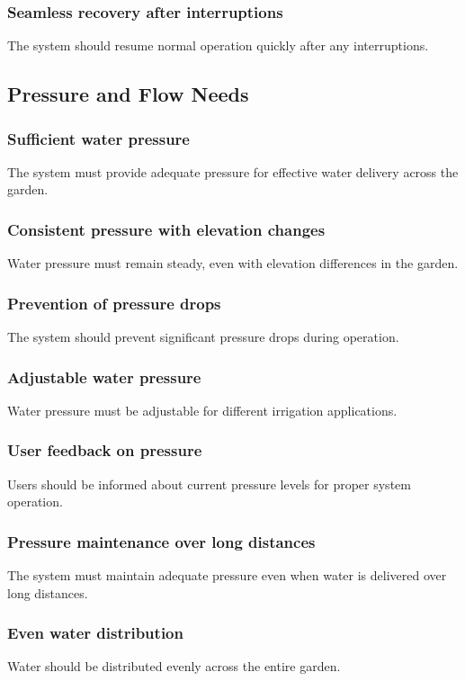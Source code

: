 \documentclass[11pt]{article}
\begin{document}
\subsubsection{Seamless recovery after interruptions}
The system should resume normal operation quickly after any interruptions.

\newpage
\subsection{Pressure and Flow Needs}

\subsubsection{Sufficient water pressure}
The system must provide adequate pressure for effective water delivery across the garden.

\subsubsection{Consistent pressure with elevation changes}
Water pressure must remain steady, even with elevation differences in the garden.

\subsubsection{Prevention of pressure drops}
The system should prevent significant pressure drops during operation.

\subsubsection{Adjustable water pressure}
Water pressure must be adjustable for different irrigation applications.

\subsubsection{User feedback on pressure}
Users should be informed about current pressure levels for proper system operation.

\subsubsection{Pressure maintenance over long distances}
The system must maintain adequate pressure even when water is delivered over long distances.

\subsubsection{Even water distribution}
Water should be distributed evenly across the entire garden.
\end{document}
